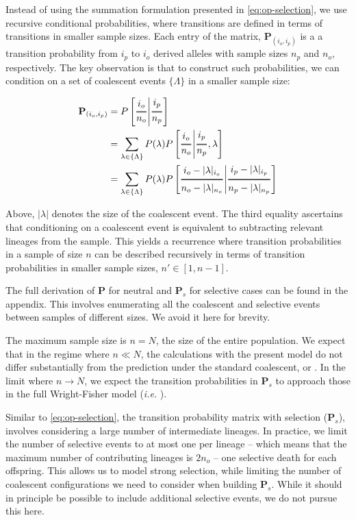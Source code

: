 \documentclass[review]{elsarticle}
\newcommand{\ra}{\rightarrow}
\newcommand{\Dfrac}[2]{%
  \ooalign{%
    $\genfrac{}{}{1.2pt}0{#1}{#2}$\cr%
    $\color{white}\genfrac{}{}{.4pt}0{\phantom{#1}}{\phantom{#2}}$}%
}
\newcommand{\cond}{\middle\vert}
\begin{document}
Instead of using the summation formulation presented in \eqref{eq:op-selection}, we use recursive
conditional probabilities, where transitions are defined in terms of transitions in smaller
sample sizes. Each entry of the matrix, $\mathbf{P}_{(i_o,i_p)}$ is a a transition probability from
$i_p$ to $i_o$ derived alleles with sample sizes $n_p$ and $n_o$, respectively. The key observation
is that to construct such probabilities, we can condition on a set of coalescent events
$\{\Lambda\}$ in a smaller sample size:

\begin{align*}
  \label{eq:coal-recursion}
  \mathbf{P}_{(i_o,i_p)} &= P\left[\Dfrac{i_o}{n_o} \cond \Dfrac{i_p}{n_p}\right] \\
  &= \sum_{\lambda\in\{\Lambda\}}P(\lambda)
  P\left[\Dfrac{i_o}{n_o} \cond \Dfrac{i_p}{n_p},\lambda\right] \\
  &= \sum_{\lambda\in\{\Lambda\}}P(\lambda)
  P\left[\Dfrac{i_o-|\lambda|_{i_o}}{n_o-|\lambda|_{n_o}} \cond \Dfrac{i_p-|\lambda|_{i_p}}{n_p-|\lambda|_{n_p}}\right]
\end{align*}

Above, $|\lambda|$ denotes the size of the coalescent event. The third equality ascertains that
conditioning on a coalescent event is equivalent to subtracting relevant lineages from the sample.
This yields a recurrence where transition probabilities in a sample of size $n$ can be
described recursively in terms of transition probabilities in smaller sample sizes, $n' \in [1, n-1]$.

The full derivation of $\mathbf{P}$ for neutral and $\mathbf{P}_s$ for selective cases can be found
in the appendix. This involves enumerating all the coalescent and selective events between samples of
different sizes. We avoid it here for brevity.

The maximum sample size is $n=N$, the size of the entire population. We expect that in the regime
where $n\ll N$, the calculations with the present model do not differ substantially from the
prediction under the standard coalescent, or \citep{JouganousEtAl2017}. In the limit where
$n \ra N$, we expect the transition probabilities in $\mathbf{P}_s$ to approach those in the full
Wright-Fisher model (\textit{i.e.} \cite[eq. 1.58]{Ewens2004}).

Similar to \eqref{eq:op-selection}, the transition probability matrix with selection
($\mathbf{P}_s$), involves considering a large number of intermediate lineages. In practice, we
limit the number of selective events to at most one per lineage -- which means that the maximum
number of contributing lineages is $2n_o$ -- one selective death for each offspring. This allows us
to model strong selection, while limiting the number of coalescent configurations we need to
consider when building $\mathbf{P}_s$. While it should in principle be possible to include
additional selective events, we do not pursue this here.
\end{document}

